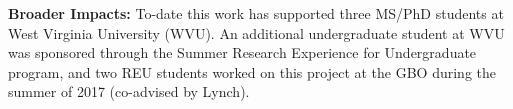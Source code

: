 \documentclass[10pt]{myNSF}
\begin{document}
{\bf Broader Impacts:} To-date this work has supported three MS/PhD
students at West Virginia University (WVU).  An additional
undergraduate student at WVU was sponsored through the Summer Research
Experience for Undergraduate program, and two REU students worked on
this project at the GBO during the summer of 2017 (co-advised by
Lynch).

{}

\end{document}
